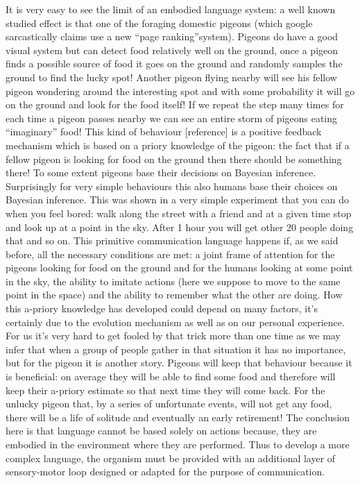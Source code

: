 It is very easy to see the limit of an embodied language system: a well known studied
effect is that one of the foraging domestic pigeons (which google sarcastically claims
use a new “page ranking”system). Pigeons do have a good visual system but can
detect food relatively well on the ground, once a pigeon finds a possible source of food
it goes on the ground and randomly samples the ground to find the lucky spot!
Another pigeon flying nearby will see his fellow pigeon wondering around the interesting
spot and with some probability it will go on the ground and look for the food itself!
If we repeat the step many times for each time a pigeon passes nearby we can see an
entire storm of pigeons eating “imaginary” food! This kind of behaviour [reference]
is a positive feedback mechanism which is based on a priory knowledge of the pigeon:
the fact that if a fellow pigeon is looking for food on the ground then there should
be something there! To some extent pigeons base their decisions on Bayesian inference.
Surprisingly for very simple behaviours this also humans base their choices on Bayesian
inference. This was shown in a very simple experiment that you can do when you feel
bored: walk along the street with a friend and at a given time stop and look up at a 
point in the sky. After 1 hour you will get other 20 people doing that and so on.
This primitive communication language happens if, as we said before, all the necessary
conditions are met: a joint frame of attention for the pigeons looking for food on
the ground and for the humans looking at some point in the sky, the ability to
imitate actions (here we suppose to move to the same point in the space) and the
ability to remember what the other are doing. How this a-priory knowledge has
developed could depend on many factors, it's certainly due to the evolution
mechanism as well as on our personal experience. For us it's very hard to get
fooled by that trick more than one time as we may infer that when a group of
people gather in that situation it has no importance, but for the pigeon it is another
story. Pigeons will keep that behaviour because it is beneficial:
on average they will be able to find some food and therefore will keep
their a-priory estimate so that next time they will come back.
For the unlucky pigeon that, by a series of unfortunate events, will not get any food,
there will be a life of solitude and eventually an early retirement!
The conclusion here is that language cannot be based solely on actions because,
they are embodied in the environment where they are performed.
Thus to develop a more complex language, the organism must be provided with
an additional layer of sensory-motor loop designed or adapted for the purpose of communication.


